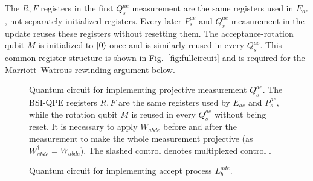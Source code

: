 \documentclass[aps,floatfix,10pt,amssymb,amsfont,amsmath,superscriptaddress,float,nofootinbib,longbibliography,nobalancelastpage,twocolumn]{revtex4-2}
\begin{document}
The $R,F$ registers in the first $Q_s^{ae}$ measurement are the same registers used in $E_{ae}$, not separately initialized registers. Every later $P_s^{ae}$ and $Q_s^{ae}$ measurement in the update reuses these registers without resetting them. The acceptance-rotation qubit $M$ is initialized to $\ket{0}$ once and is similarly reused in every $Q_s^{ae}$. This common-register structure is shown in Fig.~\ref{fig:fullcircuit} and is required for the Marriott--Watrous rewinding argument below.
\begin{figure}

\caption{Quantum circuit for implementing projective measurement $Q_s^{ae}$. The BSI-QPE registers $R, F$ are the same registers used by $E_{ae}$ and $P_s^{ae}$, while the rotation qubit $M$ is reused in every $Q_s^{ae}$ without being reset. It is necessary to apply $W_{abde}$ before and after the measurement to make the whole measurement projective (as $W_{abde}^{\dagger}=W_{abde}$). The slashed control denotes multiplexed control \cite{low2024trading}.}
\label{fig:Qcircuit}
\end{figure}

\begin{figure}

\caption{Quantum circuit for implementing accept process $L_b^{ade}$.}
\label{fig:LQ_circuit}
\end{figure}
\end{document}
